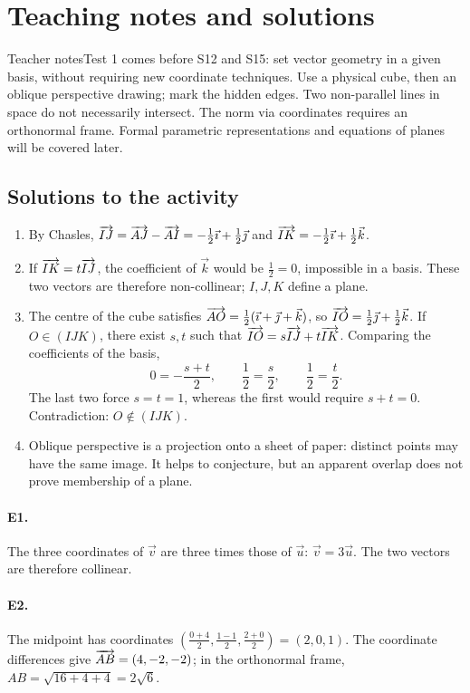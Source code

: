 \ifprof\clearpage\section{Teaching notes and solutions}\begin{profbox}{Teacher notes}Test 1 comes before S12 and S15: set vector geometry in a given basis, without requiring new coordinate techniques. Use a physical cube, then an oblique perspective drawing; mark the hidden edges. Two non-parallel lines in space do not necessarily intersect. The norm via coordinates requires an orthonormal frame. Formal parametric representations and equations of planes will be covered later.\end{profbox}

\subsection{Solutions to the activity}\begin{enumerate}
\item By Chasles, $\overrightarrow{IJ}=\overrightarrow{AJ}-\overrightarrow{AI}=-\frac12\vec{\imath} +\frac12\vec{\jmath} $ and $\overrightarrow{IK}=-\frac12\vec{\imath} +\frac12\vec k$.
\item If $\overrightarrow{IK}=t\overrightarrow{IJ}$, the coefficient of $\vec k$ would be $\frac{1}{2}=0$, impossible in a basis. These two vectors are therefore non-collinear; $I,J,K$ define a plane.
\item The centre of the cube satisfies $\overrightarrow{AO}=\frac12(\vec{\imath} +\vec{\jmath} +\vec k)$, so $\overrightarrow{IO}=\frac12\vec{\jmath} +\frac12\vec k$. If $O\in(IJK)$, there exist $s,t$ such that $\overrightarrow{IO}=s\overrightarrow{IJ}+t\overrightarrow{IK}$. Comparing the coefficients of the basis,
\[0=-\frac{s+t}2,\qquad \frac12=\frac s2,\qquad \frac12=\frac t2.\]
The last two force $s=t=1$, whereas the first would require $s+t=0$. Contradiction: $O\notin(IJK)$.
\item Oblique perspective is a projection onto a sheet of paper: distinct points may have the same image. It helps to conjecture, but an apparent overlap does not prove membership of a plane.
\end{enumerate}

\paragraph{E1.}The three coordinates of $\vec v$ are three times those of $\vec u$: $\vec v=3\vec u$. The two vectors are therefore collinear.

\paragraph{E2.}The midpoint has coordinates $(\frac{0+4}{2},\frac{1-1}{2},\frac{2+0}{2})=(2,0,1)$. The coordinate differences give $\overrightarrow{AB}=(4,-2,-2)$; in the orthonormal frame, $AB=\sqrt{16+4+4}=2\sqrt6$.

